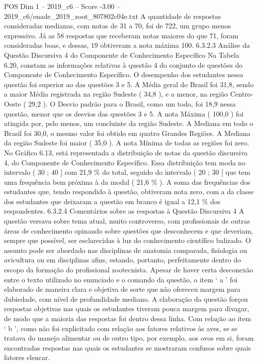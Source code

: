 \begin{textsample}{POS Dim 1 – 2019\_c6 – Score -3.00 – 2019\_c6/enade\_2019\_zoot\_807802c04e.txt}
A quantidade de respostas consideradas medianas, com notas de 31 a 70, foi de 722, um grupo menos expressivo.
Já as 58 respostas que receberam notas maiores do que 71, foram consideradas boas, e dessas, 19 obtiveram a nota máxima 100. 6.3.2.3 Análise da Questão Discursiva 4 do Componente de Conhecimento Específico Na Tabela 6.20, constam as informações relativas à questão 4 do conjunto de questões do Componente de Conhecimento Específico.
O desempenho dos estudantes nessa questão foi superior ao das questões 3 e 5.
A Média geral do Brasil foi 31,8, sendo a maior Média registrada na região Sudeste ( 34,8 ), e a menor, na região Centro-Oeste ( 29,2 ).
O Desvio padrão para o Brasil, como um todo, foi 18,9 nessa questão, menor que os desvios das questões 3 e 5.
A nota Máxima ( 100,0 ) foi atingida por, pelo menos, um concluinte da região Sudeste.
A Mediana em todo o Brasil foi 30,0, o mesmo valor foi obtido em quatro Grandes Regiões.
A Mediana da região Sudeste foi maior ( 35,0 ).
A nota Mínima de todas as regiões foi zero.
No Gráfico 6.13, está representada a distribuição de notas da questão discursiva 4, do Componente de Conhecimento Específico.
Essa distribuição tem moda no intervalo ( 30 ; 40 ] com 21,9 \% do total, seguido do intervalo ( 20 ; 30 ] que tem uma frequência bem próxima à da modal ( 21,6 \% ).
A soma das frequências dos estudantes que, tendo respondido à questão, obtiveram nota zero, com a da classe dos estudantes que deixaram a questão em branco é igual a 12,1 \% dos respondentes. 6.3.2.4 Comentários sobre as respostas à Questão Discursiva 4 A questão versava sobre tema atual, muito controverso, com profissionais de outras áreas de conhecimento opinando sobre questões que desconhecem e que deveriam, sempre que possível, ser esclarecidas à luz do conhecimento científico balizado.
O assunto pode ser abordado nas disciplinas de anatomia comparada, fisiologia ou avicultura ou em disciplinas afins, estando, portanto, perfeitamente dentro do escopo da formação do profissional zootecnista.
Apesar de haver certa desconexão entre o texto utilizado no enunciado e o comando da questão, o item ‘ a ’ foi elaborado de maneira clara e objetiva de sorte que não ofereceu margem para dubiedade, com nível de profundidade mediano.
A elaboração da questão forçou respostas objetivas nas quais os estudantes tiveram pouca margem para divagar, de modo que a maioria das respostas foi dentro dessa linha.
Com relação ao item ‘ b ’, como não foi explicitado com relação aos fatores relativos às aves, se se tratava do manejo alimentar ou de outro tipo, por exemplo, aos ovos em si, foram encontradas respostas nas quais os estudantes se mostraram confusos sobre quais fatores elencar.

\end{textsample}
